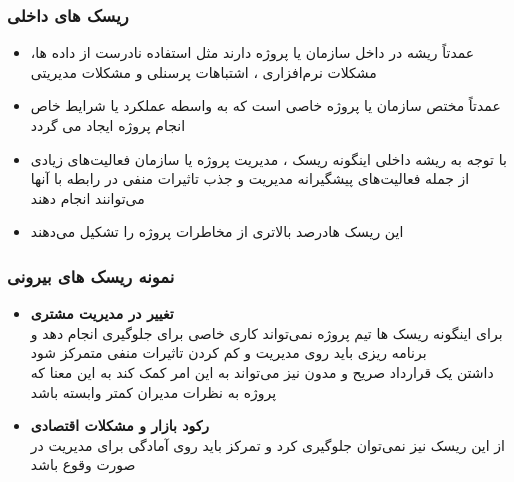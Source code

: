 \documentclass[xcolor=dvipsnames,professionalfonts]{beamer}
\begin{document}
\begin{frame}
	\frametitle{ریسک های داخلی }
	\begin{itemize}
		\item عمدتاً ریشه در داخل سازمان یا پروژه دارند مثل استفاده نادرست از داده ها، مشکلات نرم‌افزاری ، اشتباهات پرسنلی و مشکلات مدیریتی 
		\item عمدتاً مختص سازمان یا پروژه خاصی است که به واسطه عملکرد یا شرایط خاص انجام پروژه ایجاد می گردد 
		\item با توجه به ریشه داخلی اینگونه ریسک ، مدیریت پروژه یا سازمان فعالیت‌های زیادی از جمله فعالیت‌های پیشگیرانه مدیریت و جذب تاثیرات منفی در رابطه با آنها می‌توانند انجام دهند 
		\item این ریسک هادرصد بالاتری از مخاطرات پروژه را تشکیل می‌دهند
		
	\end{itemize}
\end{frame}
\begin{frame}
	\frametitle{نمونه ریسک های بیرونی}
	 
	\begin{itemize}
		\item\textbf{تغییر در مدیریت مشتری} 
		\\
		برای اینگونه ریسک ها تیم پروژه نمی‌تواند کاری خاصی برای جلوگیری انجام دهد و برنامه ریزی باید روی مدیریت و کم کردن تاثیرات منفی متمرکز شود
			\\
		داشتن یک قرارداد صریح و مدون نیز می‌تواند به این امر کمک کند به این معنا که پروژه به نظرات مدیران کمتر وابسته باشد 
		\item\textbf{رکود بازار و مشکلات اقتصادی}  
		\\
		از این ریسک نیز نمی‌توان جلوگیری کرد و تمرکز باید روی آمادگی برای مدیریت در صورت وقوع باشد
	\end{itemize}
\end{frame}
\end{document}
